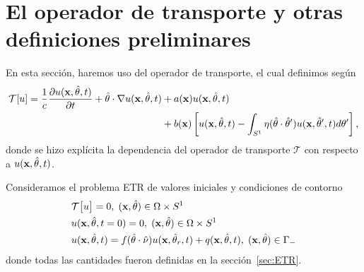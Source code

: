 \section{El operador de transporte y otras definiciones preliminares}
En esta sección, haremos uso del operador de transporte, el cual definimos
según
\begin{equation}
\begin{split}
\mathcal{T}[u]=\frac{1}
{c}\frac{\partial u(\mathbf{x},\hat{\theta},t)}{\partial t} + \hat{\theta} \cdot \nabla u(\mathbf{x},\hat{\theta},t)&+a(\mathbf{x})u(\mathbf{x},\hat{\theta},t)\\
&+b(\mathbf{x})\left[u(\mathbf{x},\hat{\theta},t) - \int_{S^1}\eta(\hat{\theta}\cdot\hat{\theta} ') u(\mathbf{x},\hat{\theta}',t) d\theta'\right],
\end{split}
\label{eq:Toper}
\end{equation}
donde se hizo explícita la dependencia del operador de transporte $\mathcal{T}$ 
con respecto a $u(\mathbf{x},\hat{\theta},t)$. 

Consideramos el problema ETR de valores iniciales y condiciones 
de contorno
\begin{equation}
\begin{split}
\begin{aligned}
&\mathcal{T}\big[u\big]=0, \;  (\mathbf{x},\hat{\theta})  \in \Omega\times S^1\\
&u(\mathbf{x},\hat{\theta},t=0)=0, \;  (\mathbf{x},\hat{\theta})  \in \Omega\times S^1 \\
&u(\mathbf{x},\hat{\theta},t)=f(\hat{\theta} \cdot \hat{\nu}) u(\mathbf{x},\hat{\theta}_r,t) + q(\mathbf{x},\hat{\theta},t) , \; (\mathbf{x},\hat{\theta}) \in \Gamma_-
\end{aligned}
\end{split}
\label{eq:RTEt}
\end{equation}
donde todas las cantidades fueron definidas en la sección~\ref{sec:ETR}.


